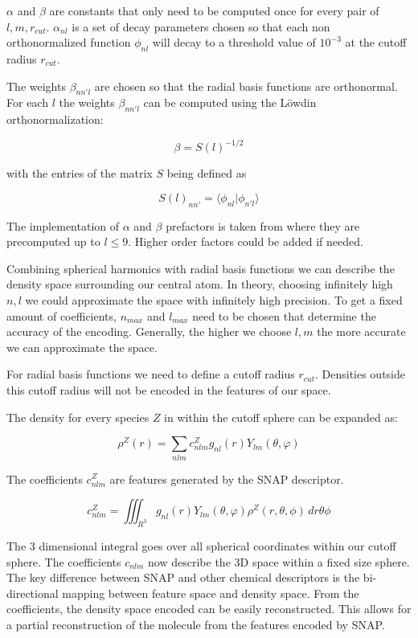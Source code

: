 $\alpha$ and $\beta$ are constants that only need to be computed once for every pair of $l,m, r_{cut}$.
$\alpha_{nl}$ is a set of decay parameters chosen so that each non orthonormalized function $\phi_{nl}$ 
will decay to a threshold value of $10^{-3}$ at the cutoff radius $r_{cut}$.

The weights $\beta_{nn'l}$ are chosen so that the radial basis functions are orthonormal.
For each $l$ the weights $\beta_{nn'l}$ can be computed using the Löwdin orthonormalization:

$$\beta = S(l)^{-1/2} $$

with the entries of the matrix $S$ being defined as

$$S(l)_{nn'} = \langle \phi_{nl} | \phi_{n'l} \rangle  $$

The implementation of $\alpha$ and $\beta$ prefactors is taken from \cite{dscribe} where they are precomputed up to $l \leq 9$.
Higher order factors could be added if needed.


Combining spherical harmonics with radial basis functions we can describe the density space surrounding our central atom.
In theory, choosing infinitely high $n, l$ we could approximate the space with infinitely high precision.
To get a fixed amount of coefficients, $n_{max}$ and $l_{max}$ need to be chosen that determine the
accuracy of the encoding.
Generally, the higher we choose $l, m$ the more accurate we can approximate the space.

For radial basis functions we need to define a cutoff radius $r_{cut}$.
Densities outside this cutoff radius will not be encoded in the features of our space.

The density for every species $Z$ in within the cutoff sphere can be expanded as:

$$ \rho^Z(r) = \sum_{nlm} c^Z_{nlm} g_{nl}(r) Y_{lm}(\theta, \varphi) $$

The coefficients $c_{nlm}^Z$ are features generated by the SNAP descriptor.

$$ c_{nlm}^Z = \iiint_{R^3} g_{nl}(r) Y_{lm}(\theta, \varphi) \rho^Z(r, \theta, \phi)  \,dr\theta\phi   $$

The 3 dimensional integral goes over all spherical coordinates within our cutoff sphere.
The coefficients $c_{nlm}$ now describe the 3D space within a fixed size sphere.
\\
The key difference between SNAP and other chemical descriptors is the bi-directional mapping between feature space and 
density space.
From the coefficients, the density space encoded can be easily reconstructed.
This allows for a partial reconstruction of the molecule from the features encoded by SNAP.


